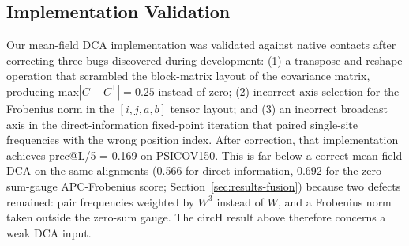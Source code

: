 \subsection{Implementation Validation}
Our mean-field DCA implementation was validated against native contacts after
correcting three bugs discovered during development: (1) a transpose-and-reshape
operation that scrambled the block-matrix layout of the covariance matrix,
producing max$|C - C^{\mathsf{T}}| = 0.25$ instead of zero; (2) incorrect axis
selection for the Frobenius norm in the $[i,j,a,b]$ tensor layout; and (3) an
incorrect broadcast axis in the direct-information fixed-point iteration that
paired single-site frequencies with the wrong position index.  After
correction, that implementation achieves prec@L/5 = 0.169 on PSICOV150.
This is far below a correct mean-field DCA on the same alignments (0.566 for
direct information, 0.692 for the zero-sum-gauge APC-Frobenius score;
Section~\ref{sec:results-fusion}) because two defects remained: pair
frequencies weighted by $W^3$ instead of $W$, and a Frobenius norm taken
outside the zero-sum gauge.  The circH result above therefore concerns a
weak DCA input.
